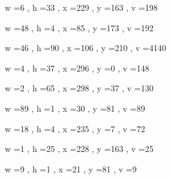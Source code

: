 \documentclass[11pt]{article}
\begin{document}
w =6 , h =33 , x =229 , y =163 , v =198
\par
w =48 , h =4 , x =85 , y =173 , v =192
\par
w =46 , h =90 , x =106 , y =210 , v =4140
\par
w =4 , h =37 , x =296 , y =0 , v =148
\par
w =2 , h =65 , x =298 , y =37 , v =130
\par
w =89 , h =1 , x =30 , y =81 , v =89
\par
w =18 , h =4 , x =235 , y =7 , v =72
\par
w =1 , h =25 , x =228 , y =163 , v =25
\par
w =9 , h =1 , x =21 , y =81 , v =9
\par
\newpage
\end{document}
